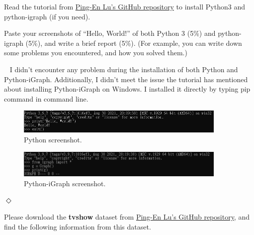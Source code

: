 \documentclass[12pt]{article}
\newcommand {\bsolution}{\noindent {\em Solution:} \ }
\newcommand{\esolution}{\hfill $\Diamond$ \\ \vspace{.3cm}}
\begin{document}
Read the tutorial from \href{https://github.com/PingEnLu/Network-Science-COM530500/tree/master/Network_Science_Python_iGraph_Tutorial}{Ping-En Lu's GitHub repository} to install Python3 and python-igraph (if you need).

Paste your screenshots of “Hello, World!” of both Python 3 (5\%) and python-igraph (5\%), and write a brief report (5\%). (For example, you can write down some problems you encountered, and how you solved them.)

\bsolution
I didn't encounter any problem during the installation of both Python and Python-iGraph.
Additionally, I didn't meet the issue the tutorial has mentioned about installing Python-iGraph on Windows. I installed it directly by typing pip command in command line.

\begin{figure}[h]
	\centering
	\includegraphics[width=0.9\textwidth]{fig-prob5-python.png}
	\caption{Python screenshot.}
	\label{HW1_5_python}
\end{figure}
\begin{figure}[h]
	\centering
	\includegraphics[width=0.9\textwidth]{fig-prob5-igraph.png}
	\caption{Python-iGraph screenshot.}
	\label{HW1_5_igraph}
\end{figure}
\esolution
\newpage

Please download the {\bf tvshow} dataset from \href{https://github.com/PingEnLu/Network-Science-COM530500/tree/master/Network_Science_Python_iGraph_Tutorial}{Ping-En Lu's GitHub repository}, and find the following information from this dataset.
\end{document}

